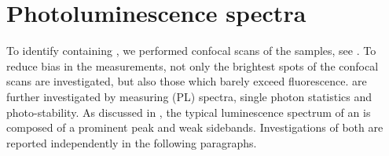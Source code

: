 
\section{Photoluminescence spectra} \label{sec::spectra}

	To identify \nds containing \sivs, we performed confocal scans of the samples, see . 
	To reduce bias in the measurements, not only the brightest spots of the confocal scans are investigated, but also those which barely exceed \bkg fluorescence.
	\sivs are further investigated by measuring \pl (PL) spectra, single photon statistics and photo-stability.
	As discussed in , the typical luminescence spectrum of an \siv is composed of a prominent \zpl peak and weak sidebands.
	Investigations of both are reported independently in the following paragraphs.

